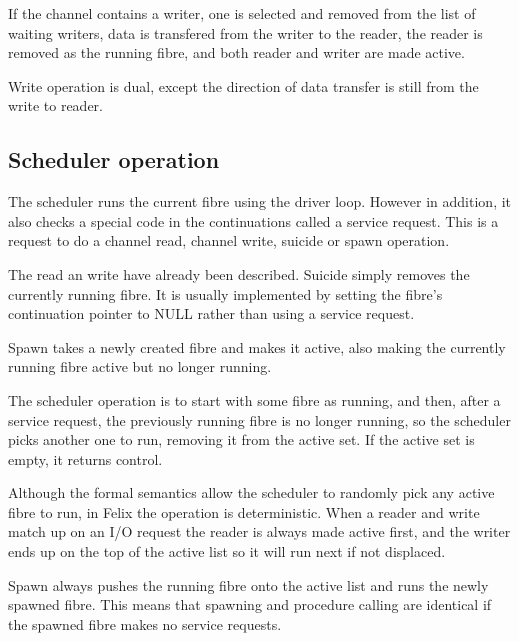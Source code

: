 \documentclass[oneside]{book}
\begin{document}
If the channel contains a writer, one is selected and removed
from the list of waiting writers, data is transfered from the writer
to the reader, the reader is removed as the running fibre, and both
reader and writer are made active.

Write operation is dual, except the direction of data transfer
is still from the write to reader.

\subsection{Scheduler operation}
The scheduler runs the current fibre using the driver loop.
However in addition, it also checks a special code in the continuations
called a service request. This is a request to do a channel read, channel
write, suicide or spawn operation.

The read an write have already been described. Suicide simply removes the
currently running fibre. It is usually implemented by setting the fibre's
continuation pointer to NULL rather than using a service request.

Spawn takes a newly created fibre and makes it active, also making
the currently running fibre active but no longer running.

The scheduler operation is to start with some fibre as running,
and then, after a service request, the previously running fibre
is no longer running, so the scheduler picks another one to run,
removing it from the active set. If the active set is empty,
it returns control.

Although the formal semantics allow the scheduler to randomly pick
any active fibre to run, in Felix the operation is deterministic.
When a reader and write match up on an I/O request the reader is
always made active first, and the writer ends up on the top
of the active list so it will run next if not displaced.

Spawn always pushes the running fibre onto the active list and runs
the newly spawned fibre. This means that spawning and procedure
calling are identical if the spawned fibre makes no service
requests.


\clearpage
{}
{}
\listoflistings
%
\clearpage
{}
\printindex[codeindex] 
%
\clearpage
{}
\printindex
%
\end{document}
